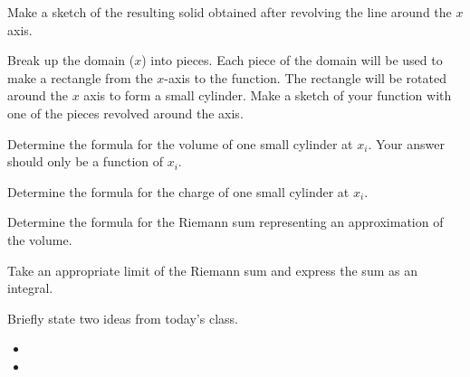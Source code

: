 \begin{problem}
\begin{subproblem}
       \item Make a sketch of the resulting solid obtained after
         revolving the line around the $x$ axis.
         \vfill

       \item Break up the domain ($x$) into pieces. Each piece of the domain will be used to make a rectangle
            from the $x$-axis to the function. The rectangle will be rotated around the $x$ axis to form a small cylinder.
            Make a sketch of your function with one of the pieces revolved around the axis.
         \vfill

       \clearpage

       \item Determine the formula for the volume of one small cylinder at $x_i$. Your answer should only be a function of $x_i$.
         \vfill

       \item Determine the formula for the charge of one small cylinder at $x_i$.
         \vfill

       \item Determine the formula for the Riemann sum representing an approximation of the volume.
         \vfill

       \item Take an appropriate limit of the Riemann sum and express the sum as an integral.
         \vfill

     \end{subproblem}

\end{problem}

\postClass

\begin{problem}
\item Briefly state two ideas from today's class.
  \begin{itemize}
  \item
  \item
  \end{itemize}
\item
  \begin{subproblem}
    \item
  \end{subproblem}
\end{problem}



